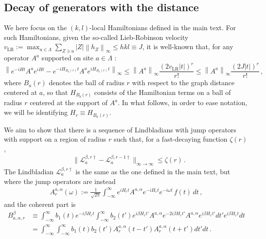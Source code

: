\documentclass[aps,pra,amsmath,amssymb,twocolumn,10pt]{revtex4-2}
\theoremstyle{definition}
\newcommand{\norm}[1]{\left\|#1\right\|}
\begin{document}
\subsection{Decay of generators with the distance}

We here focus on the $(k,l)$-local Hamiltonians defined in the main text. For such Hamiltonians, given the so-called Lieb-Robinson velocity
$v_{\text{LR}} := \max_{u\in \Lambda} \sum_{ Z\ni u} \vert Z \vert \norm{h_Z}_\infty \le hkl \equiv J$,
it is well-known that, for any operator $A^a$ supported on site $a \in \Lambda$ \cite{lieb1972finite,hastings2004lieb,nachtergaele2006lieb,HastingsKoma2006,Haah_2021}:
\begin{equation}\label{eq:LiebRobinson}
	\norm{e^{-iHt}A^a e^{iHt}-e^{-iH_{B_a(r)}t}A^a e^{iH_{B_a(r)}t}}_\infty \le \norm{A^a}_\infty \frac{(2 v_{\text{LR}}\vert t \vert)^r}{r!}\le \norm{A^a}_\infty \frac{(2J \vert t \vert)^r}{r!} \,,
\end{equation}
where $B_a(r)$ denotes the ball of radius $r$ with respect to the graph distance centered at $a$, so that $ H_{B_b(r)}$ consists of the Hamiltonian terms on a ball of radius $r$ centered at the support of $A^{a}$. In what follows, in order to ease notation, we will be identifying $H_r \equiv H_{B_a(r)}$.


We aim to show that there is a sequence of Lindbladians with jump operators with support on a region of radius $r$ such that, for a fast-decaying function $\zeta(r)$,
\begin{align}
	&\|\mathcal{L}_a^{\beta,r\dagger}-\mathcal{L}_{a}^{\beta,r-1\dagger }\|_{\infty\to\infty}\le \zeta(r)\,.\end{align}
The Lindbladian $\mathcal{L}_a^{\beta,r\dagger}$ is the same as the one defined in the main text, but where the jump operators are instead
\begin{align}
	A^{a,\alpha}_r(\omega):=\frac{1}{\sqrt{2\pi}}\int_{-\infty}^{\infty} e^{iH_rt}A^{a,\alpha} e^{-iH_r t}e^{-i\omega t}\,f(t)\,dt\,,
\end{align}
and the coherent part is 
\begin{align}
	B^\beta_{a,\alpha,r} &\equiv \int_{-\infty}^\infty b_1(t) e^{-i\beta H_r t} \int_{-\infty}^\infty b_2(t') e^{i\beta H_r t'}A^{a,\alpha} e^{-2i\beta H_r t'}A^{a,\alpha} e^{i\beta H_r t'}dt' e^{i\beta H_r t}dt \\ & = \int_{-\infty}^\infty  \int_{-\infty}^\infty b_1(t) b_2(t') A_r^{a,\alpha} (t-t') A_r^{a,\alpha}(t+t') dt' dt\,.
\end{align}
\end{document}
